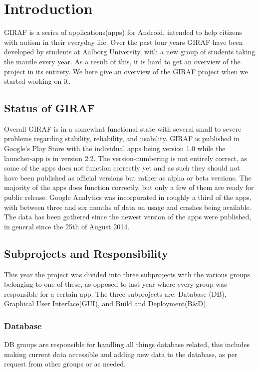 \chapter{Introduction} \label{ChapIntroduction}
GIRAF is a series of applications(apps) for Android, intended to help citizens with autism in their everyday life. Over the past four years GIRAF have been developed by students at Aalborg University, with a new group of students taking the mantle every year. As a result of this, it is hard to get an overview of the project in its entirety. We here give an overview of the GIRAF project when we started working on it.

\section{Status of GIRAF}
Overall GIRAF is in a somewhat functional state with several small to severe problems regarding stability, reliability, and usability.
GIRAF is published in Google's Play Store with the individual apps being version 1.0 while the launcher-app is in version 2.2. The version-numbering is not entirely correct, as some of the apps does not function correctly yet and as such they should not have been published as official versions but rather as alpha or beta versions. The majority of the apps does function correctly, but only a few of them are ready for public release.
Google Analytics was incorporated in roughly a third of the apps, with between three and six months of data on usage and crashes being available. The data has been gathered since the newest version of the apps were published, in general since the 25th of August 2014.

\section{Subprojects and Responsibility}
This year the project was divided into three subprojects with the various groups belonging to one of these, as opposed to last year where every group was responsible for a certain app. The three subprojects are: Database (DB), Graphical User Interface(GUI), and Build and Deployment(B\&D).

\subsection{Database}
DB groups are responsible for handling all things database related, this includes making current data accessible and adding new data to the database, as per request from other groups or as needed.

